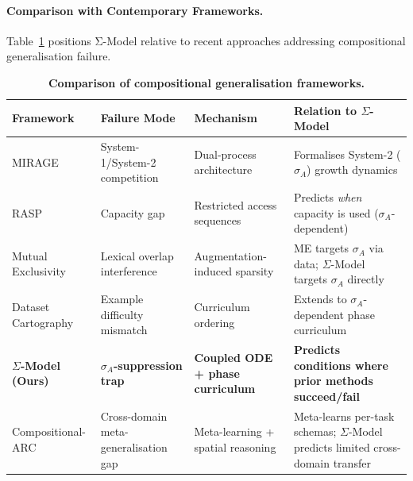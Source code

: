 \documentclass[10pt]{article}
\begin{document}
\paragraph{Comparison with Contemporary Frameworks.}
Table~\ref{tab:framework-comparison} positions Σ-Model relative to recent
approaches addressing compositional generalisation failure.

\begin{table}[htbp]
\centering
\caption{\textbf{Comparison of compositional generalisation frameworks.}}
\label{tab:framework-comparison}
\small
\begin{tabular}{>{\raggedright\arraybackslash}p{2.2cm}>{\raggedright\arraybackslash}p{2.5cm}>{\raggedright\arraybackslash}p{2.5cm}>{\raggedright\arraybackslash}p{4.8cm}}
\toprule
\textbf{Framework} & \textbf{Failure Mode} & \textbf{Mechanism} & \textbf{Relation to $\Sigma$-Model} \\
\midrule
MIRAGE \citep{noviello2025neuroscienceinspiredualprocess}
  & System-1/System-2 competition
  & Dual-process architecture
  & Formalises System-2 ($\sigma_A$) growth dynamics \\

RASP \citep{bruns2025exploringcompositionalgeneralizationin}
  & Capacity gap
  & Restricted access sequences
  & Predicts \emph{when} capacity is used ($\sigma_A$-dependent) \\

Mutual Exclusivity \citep{jiang2022mutualexclusivity}
  & Lexical overlap interference
  & Augmentation-induced sparsity
  & ME targets $\sigma_A$ via data; $\Sigma$-Model targets $\sigma_A$ directly\\

Dataset Cartography \citep{swayamdipta2020datasetcartography}
  & Example difficulty mismatch
  & Curriculum ordering
  & Extends to $\sigma_A$-dependent phase curriculum \\

\textbf{$\Sigma$-Model (Ours)}
  & \textbf{$\sigma_A$-suppression trap}
  & \textbf{Coupled ODE + phase curriculum}
  & \textbf{Predicts conditions where prior methods succeed/fail} \\

Compositional-ARC \citep{mondorf2026compositionalarc}
  & Cross-domain meta-generalisation gap
  & Meta-learning + spatial reasoning
  & Meta-learns per-task schemas; $\Sigma$-Model predicts limited cross-domain transfer \\
\bottomrule
\end{tabular}
\end{table}
\end{document}
